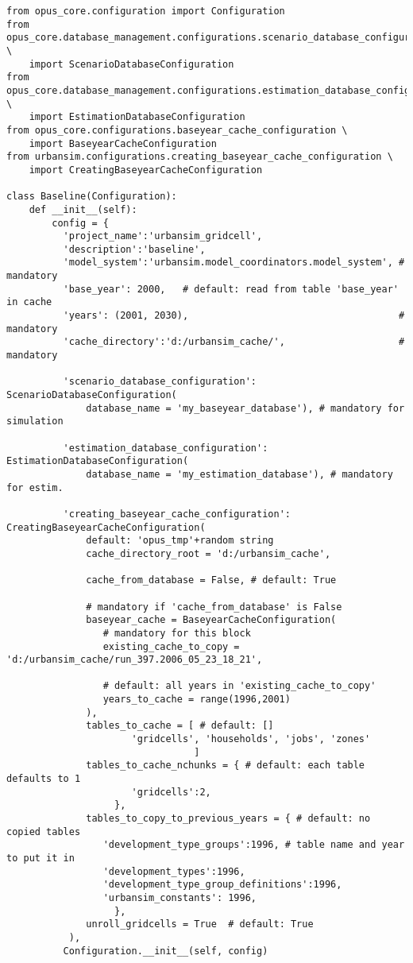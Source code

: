 \baseyearcacheindex
\begin{verbatim}
from opus_core.configuration import Configuration
from opus_core.database_management.configurations.scenario_database_configuration \
    import ScenarioDatabaseConfiguration
from opus_core.database_management.configurations.estimation_database_configuration \
    import EstimationDatabaseConfiguration
from opus_core.configurations.baseyear_cache_configuration \
    import BaseyearCacheConfiguration
from urbansim.configurations.creating_baseyear_cache_configuration \
    import CreatingBaseyearCacheConfiguration
    
class Baseline(Configuration):
    def __init__(self):
        config = {
          'project_name':'urbansim_gridcell',
          'description':'baseline',  
          'model_system':'urbansim.model_coordinators.model_system', # mandatory
          'base_year': 2000,   # default: read from table 'base_year' in cache
          'years': (2001, 2030),                                     # mandatory
          'cache_directory':'d:/urbansim_cache/',                    # mandatory
          
          'scenario_database_configuration': ScenarioDatabaseConfiguration(
              database_name = 'my_baseyear_database'), # mandatory for simulation
              
          'estimation_database_configuration': EstimationDatabaseConfiguration(
              database_name = 'my_estimation_database'), # mandatory for estim.
              
          'creating_baseyear_cache_configuration': CreatingBaseyearCacheConfiguration(
              default: 'opus_tmp'+random string
              cache_directory_root = 'd:/urbansim_cache',
              
              cache_from_database = False, # default: True
              
              # mandatory if 'cache_from_database' is False
              baseyear_cache = BaseyearCacheConfiguration(
                 # mandatory for this block
                 existing_cache_to_copy = 'd:/urbansim_cache/run_397.2006_05_23_18_21',
            
                 # default: all years in 'existing_cache_to_copy'
                 years_to_cache = range(1996,2001)
              ),
              tables_to_cache = [ # default: []
                      'gridcells', 'households', 'jobs', 'zones'
                                 ]
              tables_to_cache_nchunks = { # default: each table defaults to 1
                      'gridcells':2,
                   },
              tables_to_copy_to_previous_years = { # default: no copied tables
                 'development_type_groups':1996, # table name and year to put it in
                 'development_types':1996,
                 'development_type_group_definitions':1996,
                 'urbansim_constants': 1996,
                   },
              unroll_gridcells = True  # default: True
           ),
          Configuration.__init__(self, config)
\end{verbatim}

